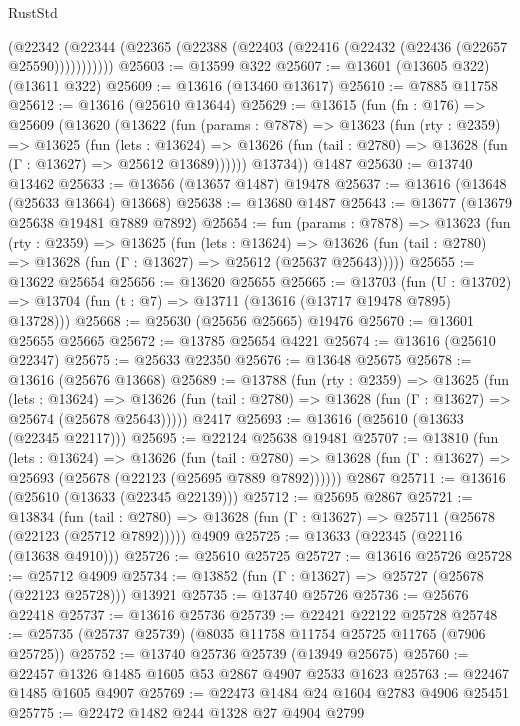 \begin{lexlean}{RustStd}
\begin{coremodule}
        (@22342 (@22344 (@22365 (@22388 (@22403 (@22416 (@22432 (@22436 (@22657 @25590)))))))))))
@25603 := @13599 @322
@25607 := @13601 (@13605 @322) (@13611 @322)
@25609 := @13616 (@13460 @13617)
@25610 := @7885 @11758
@25612 := @13616 (@25610 @13644)
@25629 := @13615
    (fun (fn : @176) =>
    @25609
      (@13620
        (@13622
          (fun (params : @7878) =>
          @13623
            (fun (rty : @2359) =>
            @13625
              (fun (lets : @13624) =>
              @13626 (fun (tail : @2780) => @13628 (fun (Γ : @13627) => @25612 @13689))))))
        @13734))
    @1487
@25630 := @13740 @13462
@25633 := @13656 (@13657 @1487) @19478
@25637 := @13616 (@13648 (@25633 @13664) @13668)
@25638 := @13680 @1487
@25643 := @13677 (@13679 @25638 @19481 @7889 @7892)
@25654 := fun (params : @7878) =>
  @13623
    (fun (rty : @2359) =>
    @13625
      (fun (lets : @13624) =>
      @13626 (fun (tail : @2780) => @13628 (fun (Γ : @13627) => @25612 (@25637 @25643)))))
@25655 := @13622 @25654
@25656 := @13620 @25655
@25665 := @13703
    (fun (U : @13702) => @13704 (fun (t : @7) => @13711 (@13616 (@13717 @19478 @7895) @13728)))
@25668 := @25630 (@25656 @25665) @19476
@25670 := @13601 @25655 @25665
@25672 := @13785 @25654 @4221
@25674 := @13616 (@25610 @22347)
@25675 := @25633 @22350
@25676 := @13648 @25675
@25678 := @13616 (@25676 @13668)
@25689 := @13788
    (fun (rty : @2359) =>
    @13625
      (fun (lets : @13624) =>
      @13626 (fun (tail : @2780) => @13628 (fun (Γ : @13627) => @25674 (@25678 @25643)))))
    @2417
@25693 := @13616 (@25610 (@13633 (@22345 @22117)))
@25695 := @22124 @25638 @19481
@25707 := @13810
    (fun (lets : @13624) =>
    @13626
      (fun (tail : @2780) =>
      @13628 (fun (Γ : @13627) => @25693 (@25678 (@22123 (@25695 @7889 @7892))))))
    @2867
@25711 := @13616 (@25610 (@13633 (@22345 @22139)))
@25712 := @25695 @2867
@25721 := @13834
    (fun (tail : @2780) => @13628 (fun (Γ : @13627) => @25711 (@25678 (@22123 (@25712 @7892)))))
    @4909
@25725 := @13633 (@22345 (@22116 (@13638 @4910)))
@25726 := @25610 @25725
@25727 := @13616 @25726
@25728 := @25712 @4909
@25734 := @13852 (fun (Γ : @13627) => @25727 (@25678 (@22123 @25728))) @13921
@25735 := @13740 @25726
@25736 := @25676 @22418
@25737 := @13616 @25736
@25739 := @22421 @22122 @25728
@25748 := @25735 (@25737 @25739) (@8035 @11758 @11754 @25725 @11765 (@7906 @25725))
@25752 := @13740 @25736 @25739 (@13949 @25675)
@25760 := @22457 @1326 @1485 @1605 @53 @2867 @4907 @2533 @1623
@25763 := @22467 @1485 @1605 @4907
@25769 := @22473 @1484 @24 @1604 @2783 @4906 @25451
@25775 := @22472 @1482 @244 @1328 @27 @4904 @2799

\end{coremodule}
\end{lexlean}
